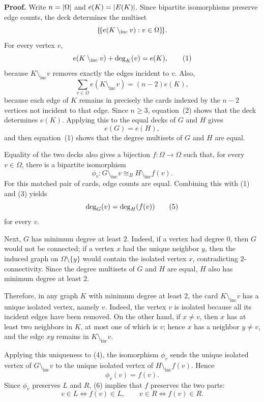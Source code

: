 \noindent \textbf{Proof.}
Write $n=\left|\Omega\right|$ and $e(K)=\left|E(K)\right|$. Since bipartite isomorphisms
preserve edge counts, the deck determines the multiset
\[
\{\!\{e(K\setminus_{\mathrm{inc}} v):v\in\Omega\}\!\}.
\]
For every vertex $v$,
\[
e(K\setminus_{\mathrm{inc}} v)+\deg_{K}(v)=e(K),                                      \tag{1}
\]
because $K\setminus_{\mathrm{inc}} v$ removes exactly the edges incident to $v$. Also,
\[
\sum_{v\in\Omega}e(K\setminus_{\mathrm{inc}} v)=(n-2)e(K),                            \tag{2}
\]
because each edge of $K$ remains in precisely the cards indexed by the
$n-2$ vertices not incident to that edge. Since $n\ge 3$, equation~(2) shows
that the deck determines $e(K)$. Applying this to the equal decks of $G$ and
$H$ gives
\[
e(G)=e(H),                                                        \tag{3}
\]
and then equation~(1) shows that the degree multisets of $G$ and $H$ are equal.

Equality of the two decks also gives a bijection $f:\Omega\to\Omega$ such that,
for every $v\in\Omega$, there is a bipartite isomorphism
\[
\phi_v:G\setminus_{\mathrm{inc}} v\cong_B H \setminus_{\mathrm{inc}}{f(v)}.                              \tag{4}
\]
For this matched pair of cards, edge counts are equal. Combining this with
(1) and (3) yields
\[
\deg_{G}(v)=\deg_{H}(f(v))                                          \tag{5}
\]
for every $v$.

Next, $G$ has minimum degree at least $2$. Indeed, if a vertex had degree $0$,
then $G$ would not be connected; if a vertex $x$ had the unique neighbor $y$,
then the induced graph on $\Omega\setminus\{y\}$ would contain the isolated
vertex $x$, contradicting $2$-connectivity. Since the
degree multisets of $G$ and $H$ are equal, $H$ also has minimum degree at least
$2$.

Therefore, in any graph $K$ with minimum degree at least $2$, the card
$K\setminus_{\mathrm{inc}} v$ has a unique isolated vertex, namely $v$. Indeed, the vertex $v$ is isolated
because all its incident edges have been removed. On the other hand, if $x\ne v$, then $x$ has at
least two neighbors in $K$, at most one of which is $v$; hence $x$ has a
neighbor $y\ne v$, and the edge $xy$ remains in $K\setminus_{\mathrm{inc}} v$.

Applying this uniqueness to (4), the isomorphism $\phi_v$ sends the unique
isolated vertex of $G\setminus_{\mathrm{inc}} v$ to the unique isolated vertex of
$H \setminus_{\mathrm{inc}} {f(v)}$. Hence
\[
\phi_v(v)=f(v).                                                    \tag{6}
\]
Since $\phi_v$ preserves $L$ and $R$, (6) implies that $f$ preserves the two
parts:
\[
v\in L \Longleftrightarrow f(v)\in L,
\qquad
v\in R \Longleftrightarrow f(v)\in R.                              \tag{7}
\]

